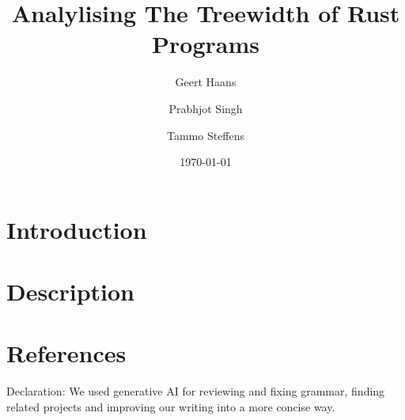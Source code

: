 \documentclass{article}
\title{Analylising The Treewidth of Rust Programs}
\author{
    Geert Haans
    \and
    Prabhjot Singh
    \and
    Tammo Steffens
}
\date{\today}
\begin{document}
\maketitle

\section{Introduction}

\section{Description}

\section{References}

Declaration: We used generative AI for reviewing and fixing grammar, finding related projects and improving our writing into a more concise way.
\end{document}
